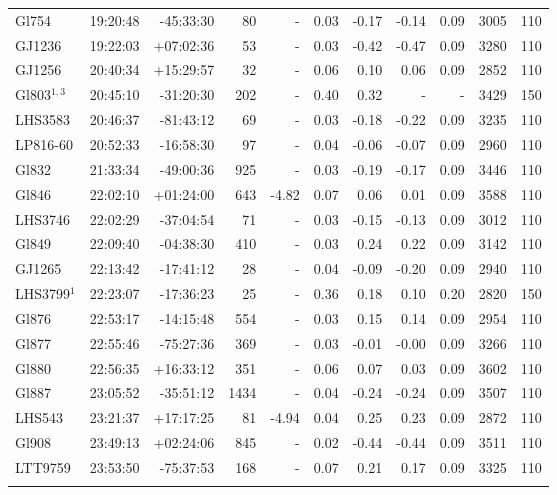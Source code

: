 \documentclass[referee]{aa}
\begin{document}
{\begin{longtable}{l r r r r r r r r r r}
Gl754 & 19:20:48 & -45:33:30 & 80 &    - & 0.03 & -0.17 & -0.14 & 0.09 & 3005 &  110 \\
GJ1236 & 19:22:03 & +07:02:36 & 53 &    - & 0.03 & -0.42 & -0.47 & 0.09 & 3280 &  110 \\
GJ1256 & 20:40:34 & +15:29:57 & 32 &    - & 0.06 & 0.10 & 0.06 & 0.09 & 2852 &  110 \\
Gl803$^{1,3}$ & 20:45:10 & -31:20:30 & 202 &    - & 0.40 & 0.32 & - & - & 3429 &  150 \\
LHS3583 & 20:46:37 & -81:43:12 & 69 &    - & 0.03 & -0.18 & -0.22 & 0.09 & 3235 &  110 \\
LP816-60 & 20:52:33 & -16:58:30 & 97 &    - & 0.04 & -0.06 & -0.07 & 0.09 & 2960 &  110 \\
Gl832 & 21:33:34 & -49:00:36 & 925 &    - & 0.03 & -0.19 & -0.17 & 0.09 & 3446 &  110 \\
Gl846 & 22:02:10 & +01:24:00 & 643 & -4.82 & 0.07 & 0.06 & 0.01 & 0.09 & 3588 &  110 \\
LHS3746 & 22:02:29 & -37:04:54 & 71 &    - & 0.03 & -0.15 & -0.13 & 0.09 & 3012 &  110 \\
Gl849 & 22:09:40 & -04:38:30 & 410 &    - & 0.03 & 0.24 & 0.22 & 0.09 & 3142 &  110 \\
GJ1265 & 22:13:42 & -17:41:12 & 28 &    - & 0.04 & -0.09 & -0.20 & 0.09 & 2940 &  110 \\
LHS3799$^1$ & 22:23:07 & -17:36:23 & 25 &    - & 0.36 & 0.18 & 0.10 & 0.20 & 2820 &  150 \\
Gl876 & 22:53:17 & -14:15:48 & 554 &    - & 0.03 & 0.15 & 0.14 & 0.09 & 2954 &  110 \\
Gl877 & 22:55:46 & -75:27:36 & 369 &    - & 0.03 & -0.01 & -0.00 & 0.09 & 3266 &  110 \\
Gl880 & 22:56:35 & +16:33:12 & 351 &    - & 0.06 & 0.07 & 0.03 & 0.09 & 3602 &  110 \\
Gl887 & 23:05:52 & -35:51:12 & 1434 &    - & 0.04 & -0.24 & -0.24 & 0.09 & 3507 &  110 \\
LHS543 & 23:21:37 & +17:17:25 & 81 & -4.94 & 0.04 & 0.25 & 0.23 & 0.09 & 2872 &  110 \\
Gl908 & 23:49:13 & +02:24:06 & 845 &    - & 0.02 & -0.44 & -0.44 & 0.09 & 3511 &  110 \\
LTT9759 & 23:53:50 & -75:37:53 & 168 &    - & 0.07 & 0.21 & 0.17 & 0.09 & 3325 &  110 \\
\label{table:full}
\end{longtable}
}
\end{document}
